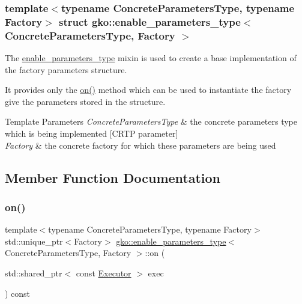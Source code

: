 \subsubsection*{template$<$typename Concrete\+Parameters\+Type, typename Factory$>$\newline
struct gko\+::enable\+\_\+parameters\+\_\+type$<$ Concrete\+Parameters\+Type, Factory $>$}

The \hyperlink{structgko_1_1enable__parameters__type}{enable\+\_\+parameters\+\_\+type} mixin is used to create a base implementation of the factory parameters structure. 

It provides only the \hyperlink{structgko_1_1enable__parameters__type_a07bc1963e83201576761e013f22ce621}{on()} method which can be used to instantiate the factory give the parameters stored in the structure.


\begin{DoxyTemplParams}{Template Parameters}
{\em Concrete\+Parameters\+Type} & the concrete parameters type which is being implemented \mbox{[}C\+R\+TP parameter\mbox{]} \\
\hline
{\em Factory} & the concrete factory for which these parameters are being used \\
\hline
\end{DoxyTemplParams}


\subsection{Member Function Documentation}
\mbox{\label{structgko_1_1enable__parameters__type_a07bc1963e83201576761e013f22ce621}} 
\subsubsection{\texorpdfstring{on()}{on()}}
{\footnotesize\ttfamily template$<$typename Concrete\+Parameters\+Type, typename Factory$>$ \\
std\+::unique\+\_\+ptr$<$Factory$>$ \hyperlink{structgko_1_1enable__parameters__type}{gko\+::enable\+\_\+parameters\+\_\+type}$<$ Concrete\+Parameters\+Type, Factory $>$\+::on (\begin{DoxyParamCaption}\item[{std\+::shared\+\_\+ptr$<$ const \hyperlink{classgko_1_1Executor}{Executor} $>$}]{exec }\end{DoxyParamCaption}) const\hspace{0.3cm}{\ttfamily [inline]}}



